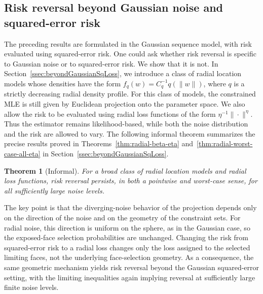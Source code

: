 \documentclass[11pt]{article}
\theoremstyle{plain}
\newtheorem{theorem}{Theorem}[section]
\theoremstyle{definition}
\begin{document}
\subsection{Risk reversal beyond Gaussian noise and squared-error risk}

The preceding results are formulated in the Gaussian sequence model, with risk
evaluated using squared-error risk. One could ask whether risk reversal is
specific to Gaussian noise or to squared-error risk. We show that it is not. In
Section~\ref{ssec:beyondGaussianSqLoss}, we introduce a class of radial
location models whose densities have the form $f_q(w)=C_q^{-1}q(\|w\|)$, where $q$ is a strictly decreasing radial density profile. For this class of models, the constrained MLE is still given by Euclidean projection onto the parameter space. We also
allow the risk to be evaluated using radial loss functions of the form
$\eta^{-1}\|\cdot\|^\eta$. Thus the estimator remains likelihood-based, while
both the noise distribution and the risk are allowed to vary. The following informal theorem summarizes the precise results proved in Theorems~\ref{thm:radial-beta-eta} and~\ref{thm:radial-worst-case-all-eta} in
Section~\ref{ssec:beyondGaussianSqLoss}.

\begingroup
\renewcommand{\thetheorem}{}
\begin{theorem}[Informal]
For a broad class of radial location models and radial loss functions, risk reversal
persists, in both a pointwise and worst-case sense, for all sufficiently large
noise levels.
\end{theorem}
\addtocounter{theorem}{-1}
\endgroup

The key point is that the diverging-noise behavior of the projection depends only on the direction of the noise and on the
geometry of the constraint sets. For radial noise, this direction is uniform on
the sphere, as in the Gaussian case, so the exposed-face selection probabilities
are unchanged. Changing the risk from squared-error risk to a radial loss
changes only the loss assigned to the selected limiting faces, not the
underlying face-selection geometry. As a consequence, the same geometric
mechanism yields risk reversal beyond the Gaussian squared-error setting, with
the limiting inequalities again implying reversal at sufficiently large finite
noise levels.
\end{document}
